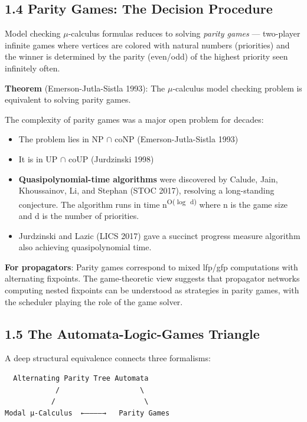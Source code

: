 \documentclass[11pt]{article}
\begin{document}
\subsection{1.4 Parity Games: The Decision Procedure}
\label{sec:org2348743}

Model checking \(\mu\)-calculus formulas reduces to solving \emph{parity games} --- two-player
infinite games where vertices are colored with natural numbers (priorities) and
the winner is determined by the parity (even/odd) of the highest priority seen
infinitely often.

\textbf{Theorem} (Emerson-Jutla-Sistla 1993): The \(\mu\)-calculus model checking problem
is equivalent to solving parity games.

The complexity of parity games was a major open problem for decades:
\begin{itemize}
\item The problem lies in NP \(\cap\) coNP (Emerson-Jutla-Sistla 1993)
\item It is in UP \(\cap\) coUP (Jurdzinski 1998)
\item \textbf{Quasipolynomial-time algorithms} were discovered by Calude, Jain, Khoussainov,
Li, and Stephan (STOC 2017), resolving a long-standing conjecture. The algorithm
runs in time n\textsuperscript{O(\(\log\) d)} where n is the game size and d is the number of
priorities.
\item Jurdzinski and Lazic (LICS 2017) gave a succinct progress measure algorithm
also achieving quasipolynomial time.
\end{itemize}

\textbf{For propagators}: Parity games correspond to mixed lfp/gfp computations with
alternating fixpoints. The game-theoretic view suggests that propagator networks
computing nested fixpoints can be understood as strategies in parity games,
with the scheduler playing the role of the game solver.
\subsection{1.5 The Automata-Logic-Games Triangle}
\label{sec:org7039cac}

A deep structural equivalence connects three formalisms:

\begin{verbatim}
  Alternating Parity Tree Automata
            /                   \
           /                     \
Modal μ-Calculus  ←————→   Parity Games
\end{verbatim}
\end{document}
